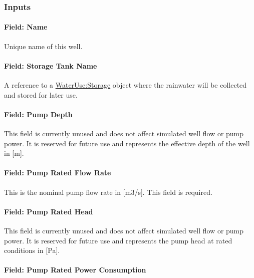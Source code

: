 \subsubsection{Inputs}\label{inputs-4-038}

\paragraph{Field: Name}\label{field-name-4-033}

Unique name of this well.

\paragraph{Field: Storage Tank Name}\label{field-storage-tank-name-1}

A reference to a \hyperref[waterusestorage]{WaterUse:Storage} object where the rainwater will be collected and stored for later use.

\paragraph{Field: Pump Depth}\label{field-pump-depth}

This field is currently unused and does not affect simulated well flow or pump power. It is reserved for future use and represents the effective depth of the well in {[}m{]}.

\paragraph{Field: Pump Rated Flow Rate}\label{field-pump-rated-flow-rate}

This is the nominal pump flow rate in {[}m3/s{]}. This field is required.

\paragraph{Field: Pump Rated Head}\label{field-pump-rated-head}

This field is currently unused and does not affect simulated well flow or pump power. It is reserved for future use and represents the pump head at rated conditions in {[}Pa{]}.

\paragraph{Field: Pump Rated Power Consumption}\label{field-pump-rated-power-consumption}

